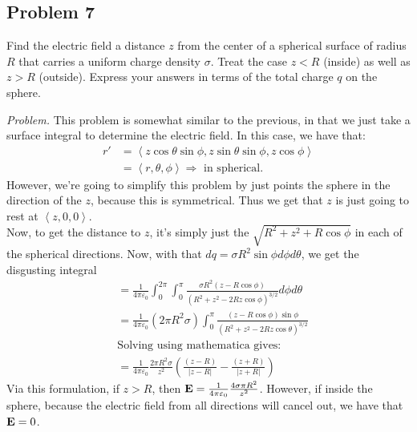 \documentclass[10pt,oneside]{book}
\newcommand{\gspc}{\vspace{0.13cm}} %
\newcommand{\gline}[0]{\gspc\\} %
\newenvironment{problem}[1]
  {\vspace{-0.1cm}\begin{tcolorbox}[problembox]
   \textit{Problem. }#1}
  {\end{tcolorbox}\gspc}
\newcommand{\cpr}[1]{\left(#1\right)}
\newcommand{\pvec}[1]{\left\langle#1\right\rangle}
\begin{document}
\subsection*{Problem 7}
Find the electric field a distance $z$ from the center of a spherical surface of radius $R$ that carries a uniform charge density $\sigma$. Treat the case $z < R$ (inside) as well as $z>R$ (outside). Express your answers in terms of the total charge $q$ on the sphere.
\begin{problem}
  This problem is somewhat similar to the previous, in that we just take a surface integral to determine the electric field. In this case, we have that:
  \begin{align*}
    r' &= \pvec{z\cos\theta\sin\phi, z\sin\theta\sin\phi,z\cos\phi}\\
    &=\pvec{r, \theta, \phi}\Rightarrow \text{ in spherical.}
  \end{align*}
  However, we're going to simplify this problem by just points the sphere in the direction of the $z$, because this is symmetrical. Thus we get that $z$ is just going to rest at $\pvec{z, 0, 0}$.\gline{} 
  Now, to get the distance to $z$, it's simply just the $\sqrt{R^2 + z^2 + R\cos\phi}$ in each of the spherical directions. Now, with that $dq = \sigma R^2\sin\phi d\phi d\theta$, we get the disgusting integral 
  \begin{align*}
    &=\frac{1}{4\pi\varepsilon_0}\int_0^{2\pi}\int_0^{\pi}\frac{\sigma R^2 (z-R\cos\phi)}{(R^2+z^2-2Rz\cos\phi)^{3/2}}d\phi d\theta\\
    &=\frac{1}{4\pi\varepsilon_0}(2\pi R^2\sigma)\int_0^\pi \frac{(z-R\cos\phi)\sin\phi}{(R^2+z^2-2Rz\cos\theta)^{3/2}}\\
    &\text{Solving using mathematica gives: }\\
    &=\frac{1}{4\pi\varepsilon_0}\frac{2\pi R^2\sigma}{z^2}\cpr{\frac{(z-R)}{|z-R|}-\frac{(z+R)}{|z+R|}}
  \end{align*}
  Via this formulation, if $z > R$, then ${\mathbf{E}} = \frac{1}{4\pi\varepsilon_0}\frac{4\sigma\pi R^2}{z^2}$. However, if inside the sphere, because the electric field from all directions will cancel out, we have that ${\mathbf{E}} = 0$. 
\end{problem}
\end{document}
